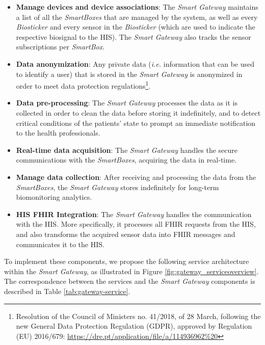 \begin{itemize}
    \item \textbf{Manage devices and device associations}: The \textit{Smart Gateway} maintains a list of all the \textit{SmartBoxes} that are managed by the system, as well as every \textit{Biosticker} and every sensor in the \textit{Biosticker} (which are used to indicate the respective biosignal to the \acs{HIS}). The \textit{Smart Gateway} also tracks the sensor subscriptions per \textit{SmartBox}.
    \item \textbf{Data anonymization}: Any private data (\textit{i.e.} information that can be used to identify a user) that is stored in the \textit{Smart Gateway} is anonymized in order to meet data protection regulations\footnote{Resolution of the Council of Ministers no. 41/2018, of 28 March, following the new General Data Protection Regulation (GDPR), approved by Regulation (EU) 2016/679:  \url{https://dre.pt/application/file/a/114936962\%20}}. 
    \item \textbf{Data pre-processing}: The \textit{Smart Gateway} processes the data as it is collected in order to clean the data before storing it indefinitely, and to detect critical conditions of the patients' state to prompt an immediate notification to the health professionals.
    \item \textbf{Real-time data acquisition}: The \textit{Smart Gateway} handles the secure communications with the \textit{SmartBoxes}, acquiring the data in real-time.
    \item \textbf{Manage data collection}: After receiving and processing the data from the \textit{SmartBoxes}, the \textit{Smart Gateway} stores indefinitely for long-term biomonitoring analytics.
    \item \textbf{\acs{HIS} \acs{FHIR} Integration}: The \textit{Smart Gateway} handles the communication with the \acs{HIS}. More specifically, it processes all \acs{FHIR} requests from the \acs{HIS}, and also transforms the acquired sensor data into \acs{FHIR} messages and communicates it to the \acs{HIS}. 
\end{itemize}

To implement these components, we propose the following service architecture within the \textit{Smart Gateway}, as illustrated in Figure \ref{fig:gateway_serviceoverview}. The correspondence between the services and the \textit{Smart Gateway} components is described in Table \ref{tab:gateway-service}.


